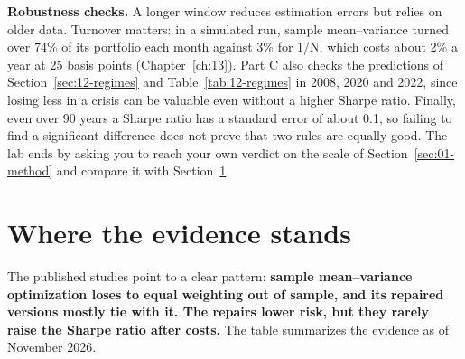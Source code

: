 \label{sec:12-stress}
\textbf{Robustness checks.} A longer window reduces estimation errors but relies on older data. Turnover matters: in a simulated run, sample mean--variance turned over 74\% of its portfolio each month against 3\% for 1/N, which costs about 2\% a year at 25 basis points (Chapter~\ref{ch:13}). Part C also checks the predictions of Section~\ref{sec:12-regimes} and Table~\ref{tab:12-regimes} in 2008, 2020 and 2022, since losing less in a crisis can be valuable even without a higher Sharpe ratio. Finally, even over 90 years a Sharpe ratio has a standard error of about 0.1, so failing to find a significant difference does not prove that two rules are equally good. The lab ends by asking you to reach your own verdict on the scale of Section~\ref{sec:01-method} and compare it with Section~\ref{sec:12-verdict}.

\section{Where the evidence stands}
\label{sec:12-verdict}

The published studies point to a clear pattern: \textbf{sample mean--variance optimization loses to equal weighting out of sample, and its repaired versions mostly tie with it. The repairs lower risk, but they rarely raise the Sharpe ratio after costs.} The table summarizes the evidence as of November 2026.

